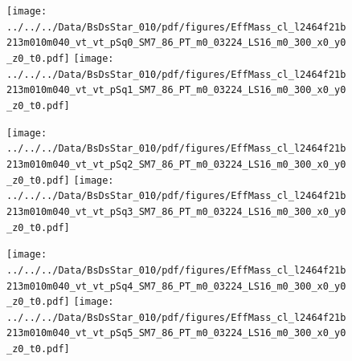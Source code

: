 \documentclass[a4paper,10pt]{article}
\begin{document}
\clearpage
\begin{figure}[p]
 \texttt{[image: ../../../Data/BsDsStar\_010/pdf/figures/EffMass\_cl\_l2464f21b213m010m040\_vt\_vt\_pSq0\_SM7\_86\_PT\_m0\_03224\_LS16\_m0\_300\_x0\_y0\_z0\_t0.pdf]} 
 \texttt{[image: ../../../Data/BsDsStar\_010/pdf/figures/EffMass\_cl\_l2464f21b213m010m040\_vt\_vt\_pSq1\_SM7\_86\_PT\_m0\_03224\_LS16\_m0\_300\_x0\_y0\_z0\_t0.pdf]} 
 \end{figure}
\begin{figure}[p]
 \texttt{[image: ../../../Data/BsDsStar\_010/pdf/figures/EffMass\_cl\_l2464f21b213m010m040\_vt\_vt\_pSq2\_SM7\_86\_PT\_m0\_03224\_LS16\_m0\_300\_x0\_y0\_z0\_t0.pdf]} 
 \texttt{[image: ../../../Data/BsDsStar\_010/pdf/figures/EffMass\_cl\_l2464f21b213m010m040\_vt\_vt\_pSq3\_SM7\_86\_PT\_m0\_03224\_LS16\_m0\_300\_x0\_y0\_z0\_t0.pdf]} 
 \end{figure}
\begin{figure}[p]
 \texttt{[image: ../../../Data/BsDsStar\_010/pdf/figures/EffMass\_cl\_l2464f21b213m010m040\_vt\_vt\_pSq4\_SM7\_86\_PT\_m0\_03224\_LS16\_m0\_300\_x0\_y0\_z0\_t0.pdf]} 
 \texttt{[image: ../../../Data/BsDsStar\_010/pdf/figures/EffMass\_cl\_l2464f21b213m010m040\_vt\_vt\_pSq5\_SM7\_86\_PT\_m0\_03224\_LS16\_m0\_300\_x0\_y0\_z0\_t0.pdf]} 
 \end{figure}
\clearpage
\clearpage
\end{document}
